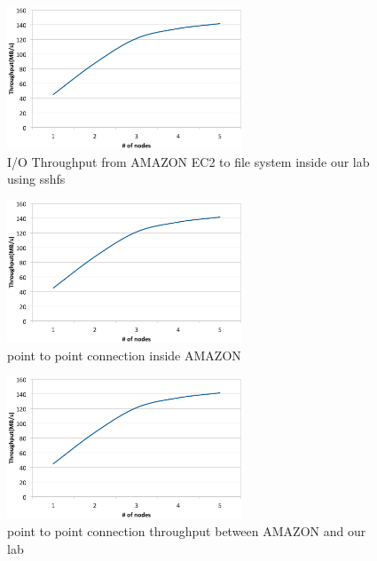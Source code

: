 \documentclass[JIP,draft]{ipsj}
\begin{document}
\begin{figure}[tb]
	\centering
	\includegraphics[width=7cm]{point_to_point_lab}
	\caption{I/O Throughput from AMAZON EC2 to file system inside our lab using sshfs}
	\label{throughput AMAZON to MATSULAB}
\end{figure}

\begin{figure}[tb]
	\centering
	\includegraphics[width=7cm]{point_to_point_lab}
	\caption{point to point connection inside AMAZON}
	\label{point to point connection AMAZON}
\end{figure}

\begin{figure}[tb]
	\centering
	\includegraphics[width=7cm]{point_to_point_lab}
	\caption{point to point connection throughput between AMAZON and our lab}
	\label{point to point connection LAB}
\end{figure}
\end{document}
